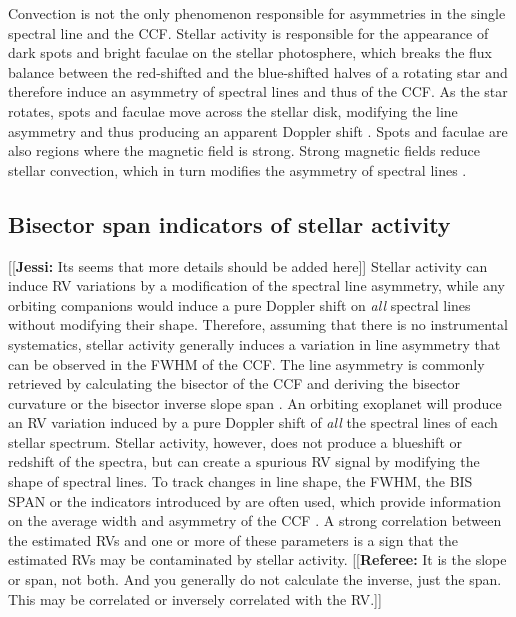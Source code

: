 \documentclass[11pt, oneside]{article}
\newcommand{\jessi}[1]{{\color{Purple}[[\textbf{Jessi: }#1]]}}
\newcommand{\comment}[1]{{\color{red}[[\textbf{Referee: }#1]]}}
\begin{document}
{Convection is not the only phenomenon responsible for asymmetries in the single spectral line and the CCF. Stellar activity is responsible for the appearance of dark spots and bright faculae on the stellar photosphere, which breaks the flux balance between the red-shifted and the blue-shifted halves of a rotating star and therefore induce an asymmetry of spectral lines and thus of the CCF. As the star rotates, spots and faculae move across the stellar disk, modifying the line asymmetry and thus producing an apparent Doppler shift \citep{Saar-1997b,Hatzes-2002,Kurster2003,Desort-2007,Lagrange-2010,Boisse-2012b}. Spots and faculae are also regions where the magnetic field is strong. Strong magnetic fields reduce stellar convection, which in turn modifies the asymmetry of spectral lines \citep[][]{Cavallini-1985a,Dravins-1981,Lindegren-2003,Meunier-2010a,Dumusque-2014b}.

\subsection{Bisector span indicators of stellar activity}
\jessi{Its seems that more details should be added here}
Stellar activity can induce RV variations by a modification of the spectral line asymmetry, while any orbiting companions would induce a pure Doppler shift on \emph{all} spectral lines without modifying their shape.
Therefore, assuming that there is no instrumental systematics, stellar activity generally induces a variation in line asymmetry that can be observed in the  FWHM of the CCF. 
The line asymmetry is commonly retrieved by calculating the bisector of the CCF \citep[][]{Voigt1956} and deriving the bisector curvature \citep[][]{Hatzes1996} or the bisector inverse slope span \citep[BIS SPAN,][]{Queloz-2001}. 
An orbiting exoplanet will produce an RV variation induced by a pure Doppler shift of \emph{all} the spectral lines of each stellar spectrum. 
Stellar activity, however, does not produce a blueshift or redshift of the spectra, but can create a spurious RV signal by modifying the shape of spectral lines. To track changes in line shape, the FWHM, the BIS SPAN or the indicators introduced by \citet{Figueira-2013} are often used, which provide information on the average width and asymmetry of the CCF \citep{Hatzes1996, fiorenzano2005line, Queloz-2001}. A strong correlation between the estimated RVs and one or more of these parameters is a sign that the estimated RVs may be contaminated by stellar activity. 
\comment{It is the slope or span, not both. And you generally do not calculate the inverse, just the
span. This may be correlated or inversely correlated with the RV.}


}
\end{document}
